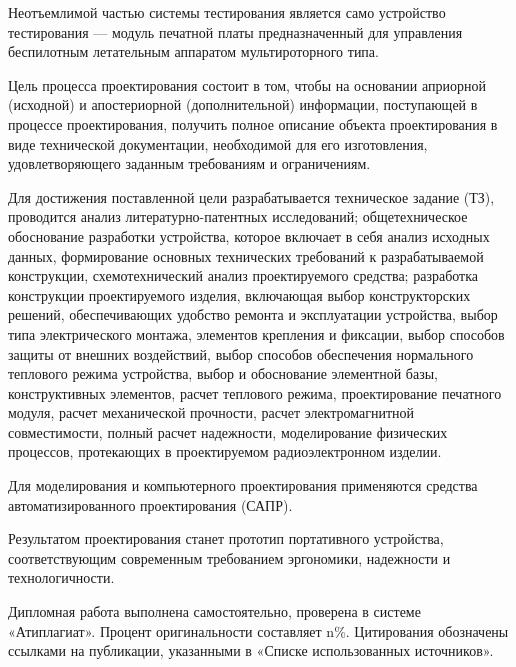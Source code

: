 Неотъемлимой частью системы тестирования является само устройство
тестирования — модуль печатной платы предназначенный для
управления беспилотным летательным аппаратом мультироторного типа.

Цель процесса проектирования состоит в том, чтобы на основании
априорной (исходной) и апостериорной (дополнительной) информации,
поступающей в процессе проектирования, получить полное описание
объекта проектирования в виде технической документации, необходимой
для его изготовления, удовлетворяющего заданным требованиям и
ограничениям.

Для достижения поставленной цели разрабатывается техническое задание
(ТЗ), проводится анализ литературно-патентных исследований;
общетехническое обоснование разработки устройства, которое включает в
себя анализ исходных данных, формирование основных технических
требований к разрабатываемой конструкции, схемотехнический анализ
проектируемого средства; разработка конструкции проектируемого
изделия, включающая выбор конструкторских решений, обеспечивающих
удобство ремонта и эксплуатации устройства, выбор типа электрического
монтажа, элементов крепления и фиксации, выбор способов защиты от
внешних воздействий, выбор способов обеспечения нормального теплового
режима устройства, выбор и обоснование элементной базы, конструктивных
элементов, расчет теплового режима, проектирование печатного модуля,
расчет механической прочности, расчет электромагнитной совместимости,
полный расчет надежности, моделирование физических процессов,
протекающих в проектируемом радиоэлектронном изделии.

Для моделирования и компьютерного проектирования применяются средства
автоматизированного проектирования (САПР).

Результатом проектирования станет прототип портативного устройства,
соответствующим современным требованием эргономики, надежности и
технологичности.

Дипломная работа выполнена самостоятельно, проверена в системе
«Атиплагиат».  Процент оригинальности составляет n\%. Цитирования
обозначены ссылками на публикации, указанными в «Списке использованных
источников».

\newpage
